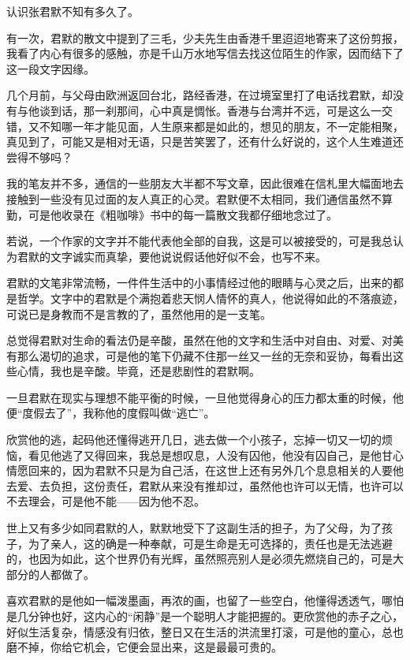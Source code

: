 \par 认识张君默不知有多久了。
\par 有一次，君默的散文中提到了三毛，少夫先生由香港千里迢迢地寄来了这份剪报，我看了内心有很多的感触，亦是千山万水地写信去找这位陌生的作家，因而结下了这一段文字因缘。
\par 几个月前，与父母由欧洲返回台北，路经香港，在过境室里打了电话找君默，却没有与他谈到话，那一刹那间，心中真是惆怅。香港与台湾并不远，可是这么一交错，又不知哪一年才能见面，人生原来都是如此的，想见的朋友，不一定能相聚，真见到了，可能又是相对无语，只是苦笑罢了，还有什么好说的，这个人生难道还尝得不够吗？
\par 我的笔友并不多，通信的一些朋友大半都不写文章，因此很难在信札里大幅面地去接触到一些没有见过面的友人真正的心灵。君默便不太相同，我们通信虽然不算勤，可是他收录在《粗咖啡》书中的每一篇散文我都仔细地念过了。
\par 若说，一个作家的文字并不能代表他全部的自我，这是可以被接受的，可是我总认为君默的文字诚实而真挚，要他说说假话他好似不会，也写不来。
\par 君默的文笔非常流畅，一件件生活中的小事情经过他的眼睛与心灵之后，出来的都是哲学。文字中的君默是个满抱着悲天悯人情怀的真人，他说得如此的不落痕迹，可说已是身教而不是言教的了，虽然他用的是一支笔。
\par 总觉得君默对生命的看法仍是辛酸，虽然在他的文字和生活中对自由、对爱、对美有那么渴切的追求，可是他的笔下仍藏不住那一丝又一丝的无奈和妥协，每看出这些心情，我也是辛酸。毕竟，还是悲剧性的君默啊。
\par 一旦君默在现实与理想不能平衡的时候，一旦他觉得身心的压力都太重的时候，他便“度假去了”，我称他的度假叫做“逃亡”。
\par 欣赏他的逃，起码他还懂得逃开几日，逃去做一个小孩子，忘掉一切又一切的烦恼，看见他逃了又得回来，我总是想叹息，人没有囚他，他没有囚自己，是他甘心情愿回来的，因为君默不只是为自己活，在这世上还有另外几个息息相关的人要他去爱、去负担，这份责任，君默从来没有推却过，虽然他也许可以无情，也许可以不去理会，可是他不能——因为他不忍。
\par 世上又有多少如同君默的人，默默地受下了这副生活的担子，为了父母，为了孩子，为了亲人，这的确是一种奉献，可是生命是无可选择的，责任也是无法逃避的，也因为如此，这个世界仍有光辉，虽然照亮别人是必须先燃烧自己的，可是大部分的人都做了。
\par 喜欢君默的是他如一幅泼墨画，再浓的画，也留了一些空白，他懂得透透气，哪怕是几分钟也好，这内心的“闲静”是一个聪明人才能把握的。更欣赏他的赤子之心，好似生活复杂，情感没有归依，整日又在生活的洪流里打滚，可是他的童心，总也磨不掉，你给它机会，它便会显出来，这是最最可贵的。
